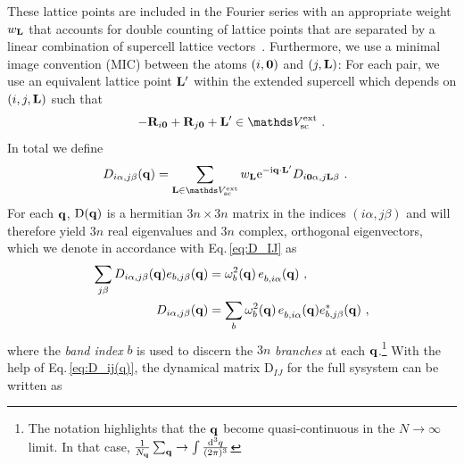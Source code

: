 These lattice points are included in the Fourier series with an appropriate weight $w_{{\bf L}}$ that accounts for double counting of lattice points that are separated by a linear combination of supercell lattice vectors~\cite{Parlinski1997}. Furthermore, we use a minimal image convention (MIC) between the atoms $(i, {\bf 0})$ and $(j, {\bf L})$: For each pair, we use an equivalent lattice point ${\bf L}'$ within the extended supercell which depends on $(i, j, {\bf L})$ such that
\begin{align}
	- \b R_{i \b 0 } + \b R_{j \b 0} + \b L' \in \mathds V_{\rm sc}^{\rm ext}~.
	\label{eq:L'}
\end{align}
In total we define
\begin{align}
	{D}_{i \alpha, j \beta} (\b q) 	
		&= %
		\sum_{\b L \in \mathds V_{\rm sc}^{\rm ext}} 
			w_{\b L}
		{\rm e}^{- \im \b q \cdot \b L'} {D}_{i \b 0 \alpha, j \b L \beta}~.
	\label{eq:D_Parlinski}
\end{align}
For each ${\bf q}$, ${\rm D} ({\bf q})$ is a hermitian $3n \times 3n$ matrix in the indices $(i \alpha, j \beta)$ and will therefore yield $3n$ real eigenvalues and $3n$ complex, orthogonal eigenvectors, which we denote in accordance with Eq.\,\eqref{eq:D_IJ} as
\begin{subequations}
\label{eq:D_ij(q)}
\begin{align}
	\sum_{j \beta} {D}_{i \alpha, j \beta} (\b q) e_{b, j \beta} (\b q)
		&= \omega^2_b (\b q) \, \fD e_{b, i \alpha} (\b q)~,
	\label{eq:D_ij(q)w} \\
	{D}_{i \alpha, j \beta} (\b q)
		&= \sum_b \omega^2_b (\b q) \, \fD e_{b, i \alpha} (\b q) e^\ast_{b, j \beta} (\b q)~,
\end{align}
\end{subequations}
where the \emph{band index} $b$ is used to discern the $3n$ \emph{branches} at each ${\bf q}$.\footnote{The notation highlights that the ${\bf q}$ become quasi-continuous in the $N \to \infty$ limit. In that case, $\frac{1}{N_{{\bf q}}} \sum_{{\bf q}} \to \int \frac{{\rm d}^3 q}{(2 \pi)^3}$} With the help of Eq.\,\eqref{eq:D_ij(q)}, the dynamical matrix $\mathrm D_{IJ}$ for the full sysystem can be written as
